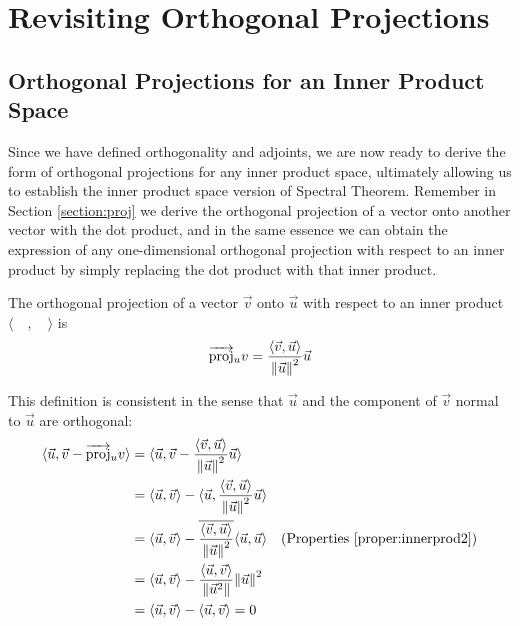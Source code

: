 \section{Revisiting Orthogonal Projections}

\subsection{Orthogonal Projections for an Inner Product Space}

Since we have defined orthogonality and adjoints, we are now ready to derive the form of orthogonal projections for any inner product space, ultimately allowing us to establish the inner product space version of Spectral Theorem. Remember in Section \ref{section:proj} we derive the orthogonal projection of a vector onto another vector with the dot product, and in the same essence we can obtain the expression of any one-dimensional orthogonal projection with respect to an inner product by simply replacing the dot product with that inner product.
\begin{defn}
\label{defn:orthoprojinner}
The orthogonal projection of a vector $\vec{v}$ onto $\vec{u}$ with respect to an inner product $\langle \quad, \quad \rangle$ is
\begin{align*}
\overrightarrow{\text{proj}}_u v = \frac{\langle \vec{v}, \vec{u}\rangle}{\norm{\vec{u}}^2} \vec{u}
\end{align*}
\end{defn}
This definition is consistent in the sense that $\vec{u}$ and the component of $\vec{v}$ normal to $\vec{u}$ are orthogonal:
\begin{align*}
\langle \vec{u}, \vec{v} - \overrightarrow{\text{proj}}_u v \rangle &= \langle \vec{u}, \vec{v} - \frac{\langle \vec{v}, \vec{u}\rangle}{\norm{\vec{u}}^2} \vec{u} \rangle \\
&= \langle \vec{u}, \vec{v} \rangle - \langle \vec{u}, \frac{\langle \vec{v}, \vec{u}\rangle}{\norm{\vec{u}}^2} \vec{u} \rangle \\
&= \langle \vec{u}, \vec{v} \rangle - \overline{\frac{\langle \vec{v}, \vec{u}\rangle}{\norm{\vec{u}}^2}} \langle \vec{u}, \vec{u} \rangle & \text{(Properties \ref{proper:innerprod2})}\\
&= \langle \vec{u}, \vec{v} \rangle - \frac{\langle \vec{u}, \vec{v}\rangle}{\norm{\vec{u}^2}} {\norm{\vec{u}}^2} \\
&= \langle \vec{u}, \vec{v} \rangle -  \langle \vec{u}, \vec{v} \rangle = 0
\end{align*}
